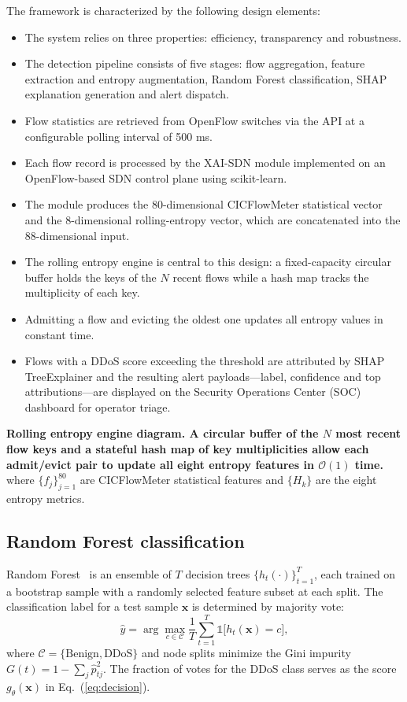 \documentclass{ieeeaccess}
\begin{document}
The framework is characterized by the following design elements:
\begin{itemize}
\item The system relies on three properties: efficiency, transparency and robustness.
\item The detection pipeline consists of five stages: flow aggregation, feature extraction and entropy augmentation, Random Forest classification, SHAP explanation generation and alert dispatch.
\item Flow statistics are retrieved from OpenFlow switches via the API at a configurable polling interval of 500 ms.
\item Each flow record is processed by the XAI-SDN module implemented on an OpenFlow-based SDN control plane using scikit-learn.
\item The module produces the 80-dimensional CICFlowMeter statistical vector and the 8-dimensional rolling-entropy vector, which are concatenated into the 88-dimensional input.
\item The rolling entropy engine is central to this design: a fixed-capacity circular buffer holds the keys of the $N$ recent flows while a hash map tracks the multiplicity of each key.
\item Admitting a flow and evicting the oldest one updates all entropy values in constant time.
\item Flows with a DDoS score exceeding the threshold are attributed by SHAP TreeExplainer and the resulting alert payloads---label, confidence and top attributions---are displayed on the Security Operations Center (SOC) dashboard for operator triage.
\end{itemize}

{ \textbf{Rolling entropy engine diagram. A circular buffer of the $N$ most recent flow keys and a stateful hash map of key multiplicities allow each admit/evict pair to update all eight entropy features in $\mathcal{O}(1)$ time.}\label{fig:entropyengine}}
where $\{f_j\}_{j=1}^{80}$ are CICFlowMeter statistical features and $\{H_k\}$ are the eight entropy metrics.

\subsection{Random Forest classification}
Random Forest~\cite{breiman2001rf} is an ensemble of $T$ decision trees $\{h_t(\cdot)\}_{t=1}^{T}$, each trained on a bootstrap sample with a randomly selected feature subset at each split. The classification label for a test sample $\mathbf{x}$ is determined by majority vote:
\begin{equation}
\hat{y} = \arg\max_{c \in \mathcal{C}} \frac{1}{T} \sum_{t=1}^{T} \mathbb{1}\bigl[h_t(\mathbf{x}) = c\bigr],
\label{eq:rfpred}
\end{equation}
where $\mathcal{C} = \{\text{Benign}, \text{DDoS}\}$ and node splits minimize the Gini impurity $G(t) = 1 - \sum_{j} \hat{p}_{tj}^{2}$. The fraction of votes for the DDoS class serves as the score $g_{\theta}(\mathbf{x})$ in Eq.~(\ref{eq:decision}).
\end{document}
